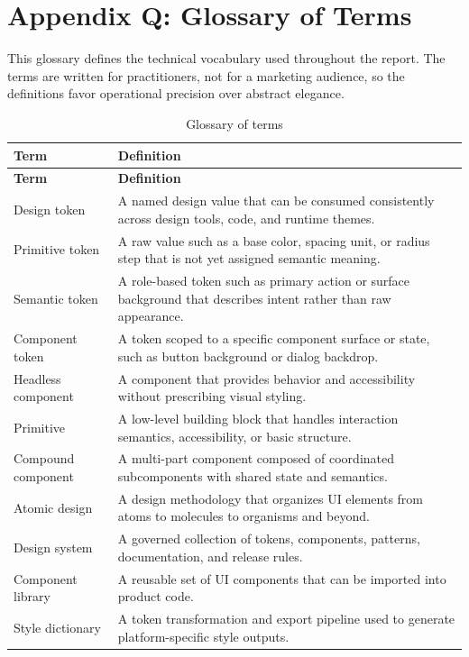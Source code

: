 \clearpage
{}
\section*{Appendix Q: Glossary of Terms}

This glossary defines the technical vocabulary used throughout the report. The terms are written for practitioners, not for a marketing audience, so the definitions favor operational precision over abstract elegance.

\begin{longtable}{@{}p{}p{}@{}}
\caption{Glossary of terms}\label{tab:glossary}\\
\toprule
\textbf{Term} & \textbf{Definition} \\
\midrule
\endfirsthead
\toprule
\textbf{Term} & \textbf{Definition} \\
\midrule
\endhead
\bottomrule
\endfoot
Design token & A named design value that can be consumed consistently across design tools, code, and runtime themes. \\
Primitive token & A raw value such as a base color, spacing unit, or radius step that is not yet assigned semantic meaning. \\
Semantic token & A role-based token such as primary action or surface background that describes intent rather than raw appearance. \\
Component token & A token scoped to a specific component surface or state, such as button background or dialog backdrop. \\
Headless component & A component that provides behavior and accessibility without prescribing visual styling. \\
Primitive & A low-level building block that handles interaction semantics, accessibility, or basic structure. \\
Compound component & A multi-part component composed of coordinated subcomponents with shared state and semantics. \\
Atomic design & A design methodology that organizes UI elements from atoms to molecules to organisms and beyond. \\
Design system & A governed collection of tokens, components, patterns, documentation, and release rules. \\
Component library & A reusable set of UI components that can be imported into product code. \\
Style dictionary & A token transformation and export pipeline used to generate platform-specific style outputs. \\

\end{longtable}
